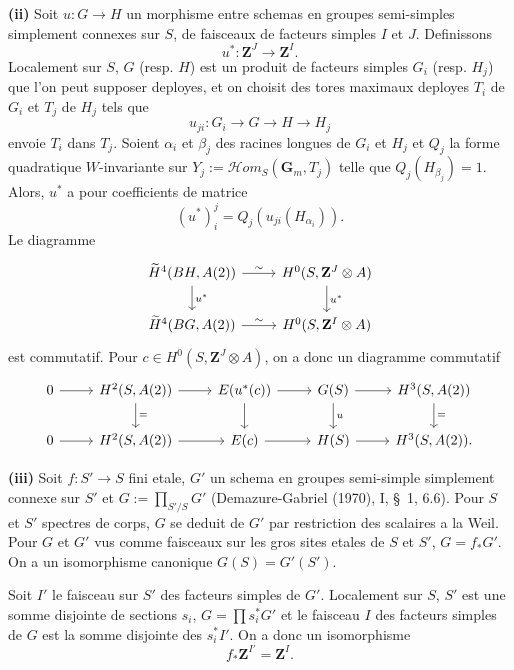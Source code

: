 \documentclass[11pt,a4paper]{article}
\theoremstyle{plain}
\theoremstyle{definition}
\begin{document}
\textbf{(ii)} Soit $u : G \to H$ un morphisme entre schemas en groupes semi-simples simplement connexes sur $S$, de faisceaux de facteurs simples $I$ et $J$. Definissons
\begin{equation}\label{3.9.1}
u^* : \mathbf{Z}^J \to \mathbf{Z}^I.
\end{equation}
Localement sur $S$, $G$ (resp. $H$) est un produit de facteurs simples $G_i$ (resp. $H_j$) que l'on peut supposer deployes, et on choisit des tores maximaux deployes $T_i$ de $G_i$ et $T_j$ de $H_j$ tels que
\[
u_{ji} : G_i \to G \to H \to H_j
\]
envoie $T_i$ dans $T_j$. Soient $\alpha_i$ et $\beta_j$ des racines longues de $G_i$ et $H_j$ et $Q_j$ la forme quadratique $W$-invariante sur $Y_j := \mathscr{H}om_S(\mathbf{G}_m, T_j)$ telle que $Q_j(H_{\beta_j}) = 1$. Alors, $u^*$ a pour coefficients de matrice
\[
(u^*)_i^j = Q_j(u_{ji}(H_{\alpha_i})).
\]
Le diagramme
\[
\begin{tikzcd}
\widetilde{H}^4(BH, A(2)) \arrow{r}{\sim} \arrow{d}{u^*} & H^0(S, \mathbf{Z}^J \otimes A) \arrow{d}{u^*} \\
\widetilde{H}^4(BG, A(2)) \arrow{r}{\sim} & H^0(S, \mathbf{Z}^I \otimes A)
\end{tikzcd}
\]
est commutatif. Pour $c \in H^0(S, \mathbf{Z}^J \otimes A)$, on a donc un diagramme commutatif
\begin{equation}\label{3.9.2}
\begin{tikzcd}
0 \arrow{r} & H^2(S, A(2)) \arrow{r} \arrow{d}{=} & E(u^*(c)) \arrow{r} \arrow{d} & G(S) \arrow{r} \arrow{d}{u} & H^3(S, A(2)) \arrow{d}{=} \\
0 \arrow{r} & H^2(S, A(2)) \arrow{r} & E(c) \arrow{r} & H(S) \arrow{r} & H^3(S, A(2)).
\end{tikzcd}
\end{equation}

\textbf{(iii)} Soit $f : S' \to S$ fini etale, $G'$ un schema en groupes semi-simple simplement connexe sur $S'$ et $G := \prod_{S'/S} G'$ (Demazure-Gabriel (1970), I, \S~1, 6.6). Pour $S$ et $S'$ spectres de corps, $G$ se deduit de $G'$ par restriction des scalaires a la Weil. Pour $G$ et $G'$ vus comme faisceaux sur les gros sites etales de $S$ et $S'$, $G = f_* G'$. On a un isomorphisme canonique $G(S) = G'(S')$.

Soit $I'$ le faisceau sur $S'$ des facteurs simples de $G'$. Localement sur $S$, $S'$ est une somme disjointe de sections $s_i$, $G = \prod s_i^* G'$ et le faisceau $I$ des facteurs simples de $G$ est la somme disjointe des $s_i^* I'$. On a donc un isomorphisme
\begin{equation}\label{3.9.3}
f_* \mathbf{Z}^{I'} = \mathbf{Z}^I.
\end{equation}
\end{document}
